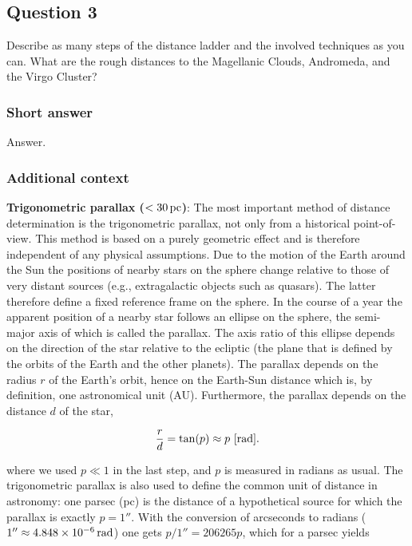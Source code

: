 \documentclass[a4paper,11pt]{article}
\begin{document}

\newpage
\subsection{Question 3}

Describe as many steps of the distance ladder and the involved techniques as you can. What are the rough distances to the Magellanic Clouds, Andromeda, and the Virgo Cluster?

\subsubsection{Short answer}

Answer.

\subsubsection{Additional context}

{\noindent}\textbf{Trigonometric parallax ($<30\,{\rm pc}$)}: The most important method of distance determination is the trigonometric parallax, not only from a historical point-of-view. This method is based on a purely geometric effect and is therefore independent of any physical assumptions. Due to the motion of the Earth around the Sun the positions of nearby stars on the sphere change relative to those of very distant sources (e.g., extragalactic objects such as quasars). The latter therefore define a fixed reference frame on the sphere. In the course of a year the apparent position of a nearby star follows an ellipse on the sphere, the semi-major axis of which is called the parallax. The axis ratio of this ellipse depends on the direction of the star relative to the ecliptic (the plane that is defined by the orbits of the Earth and the other planets). The parallax depends on the radius $r$ of the Earth’s orbit, hence on the Earth-Sun distance which is, by definition, one astronomical unit (AU). Furthermore, the parallax depends on the distance $d$ of the star,

\begin{align*}
    \frac{r}{d} = \tan(p) \approx p ~ [{\rm rad}].
\end{align*}

{\noindent}where we used $p\ll1$ in the last step, and $p$ is measured in radians as usual. The trigonometric parallax is also used to define the common unit of distance in astronomy: one parsec (pc) is the distance of a hypothetical source for which the parallax is exactly $p=1''$. With the conversion of arcseconds to radians ($1''\approx4.848\times10^{-6}\,{\rm rad}$) one gets $p/1''=206265p$, which for a parsec yields
\end{document}
